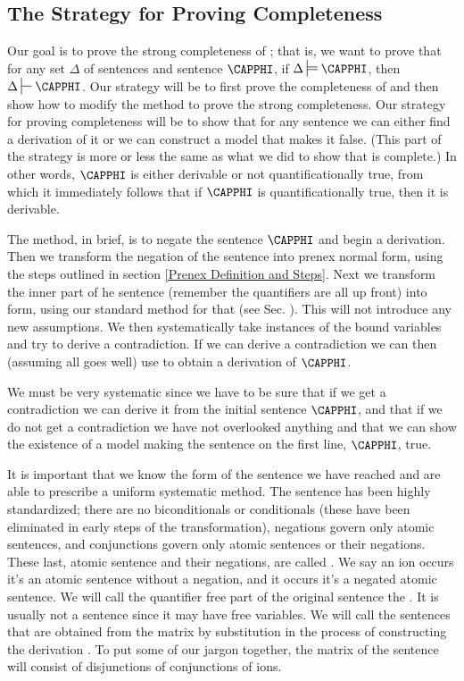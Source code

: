 \subsection{The Strategy for Proving \GQD{} Completeness}
Our goal is to prove the strong completeness of \GQD{}; 
that is, we want to prove that for any set $\Delta$ of \GQL{} sentences and \GQL{} sentence $\CAPPHI$, if $\Delta\sdtstile{}{}\CAPPHI$, then $\Delta\sststile{}{}\CAPPHI$. 
Our strategy will be to first prove the completeness of \GQD{} and then show how to modify the method to prove the strong completeness.
Our strategy for proving  completeness will be to show that for any sentence we can either find a derivation of it or we can construct a model that makes it false. 
(This part of the strategy is more or less the same as what we did to show that \GSD{} is  complete.)
In other words, $\CAPPHI$ is either derivable or not quantificationally true, from which it immediately follows that if $\CAPPHI$ is quantificationally true, then it is derivable. 

The method, in brief, is to negate the sentence $\CAPPHI$ and begin a derivation.
Then we transform the negation of the sentence into prenex normal form, using the steps outlined in section \ref{Prenex Definition and Steps}. 
Next we transform the inner part of he sentence (remember the quantifiers are all up front) into  form, using our standard method for that (see Sec. ).
This will not introduce any new assumptions. 
We then systematically take instances of the bound variables and try to derive a contradiction.
If we can derive a contradiction we can then (assuming all goes well) use  to obtain a derivation of $\CAPPHI$.

We must be very systematic since we have to be sure that if we get a contradiction we can derive it from the initial sentence $\CAPPHI$, and that if we do not get a contradiction we have not overlooked anything and that we can show the existence of a model making the sentence on the first line, $\CAPPHI$, true. 

It is important that we know the form of the sentence we have reached and are able to prescribe a uniform systematic method.
The sentence has been highly standardized; 
there are no biconditionals or conditionals (these have been eliminated in early steps of the transformation), negations govern only atomic sentences, and conjunctions govern only atomic sentences or their negations. 
These last, atomic sentence and their negations, are called . 
We say an ion occurs  \Iff it's an atomic sentence without a negation, and it occurs  \Iff it's a negated atomic sentence. 
We will call the quantifier free part of the original sentence the . 
It is usually not a sentence since it may have free variables.
We will call the sentences that are obtained from the matrix by substitution in the process of constructing the derivation . 
To put some of our jargon together, the matrix of the sentence will consist of disjunctions of conjunctions of ions. 

